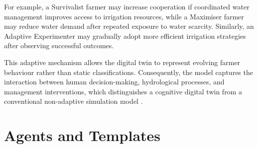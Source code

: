 \documentclass{article}
\begin{document}
For example, a Survivalist farmer may increase cooperation if coordinated water management improves access to irrigation resources, while a Maximiser farmer may reduce water demand after repeated exposure to water scarcity. Similarly, an Adaptive Experimenter may gradually adopt more efficient irrigation strategies after observing successful outcomes.

This adaptive mechanism allows the digital twin to represent evolving farmer behaviour rather than static classifications. Consequently, the model captures the interaction between human decision-making, hydrological processes, and management interventions, which distinguishes a cognitive digital twin from a conventional non-adaptive simulation model \cite{Tao2021DigitalTwin,Rasheed2020DigitalTwin}.

\section{Agents and Templates}
\end{document}
